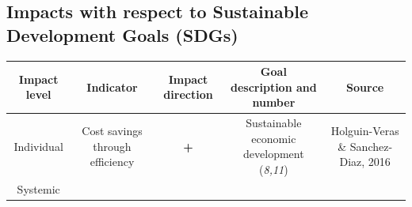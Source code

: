 \documentclass[
]{book}
\begin{document}
\hypertarget{impacts-with-respect-to-sustainable-development-goals-sdgs-30}{%
\subsection*{Impacts with respect to Sustainable Development Goals (SDGs)}\label{impacts-with-respect-to-sustainable-development-goals-sdgs-30}}

\begin{longtable}[]{@{}ccccc@{}}
\toprule
\begin{minipage}[b]{0.17\columnwidth}\centering
Impact level\strut
\end{minipage} & \begin{minipage}[b]{0.16\columnwidth}\centering
Indicator\strut
\end{minipage} & \begin{minipage}[b]{0.17\columnwidth}\centering
Impact direction\strut
\end{minipage} & \begin{minipage}[b]{0.17\columnwidth}\centering
Goal description and number\strut
\end{minipage} & \begin{minipage}[b]{0.17\columnwidth}\centering
Source\strut
\end{minipage}\tabularnewline
\midrule
\endhead
\begin{minipage}[t]{0.17\columnwidth}\centering
Individual\strut
\end{minipage} & \begin{minipage}[t]{0.16\columnwidth}\centering
Cost savings through efficiency\strut
\end{minipage} & \begin{minipage}[t]{0.17\columnwidth}\centering
\textbf{+}\strut
\end{minipage} & \begin{minipage}[t]{0.17\columnwidth}\centering
Sustainable economic development (\emph{8,11})\strut
\end{minipage} & \begin{minipage}[t]{0.17\columnwidth}\centering
Holguin-Veras \& Sanchez-Diaz, 2016\strut
\end{minipage}\tabularnewline
\begin{minipage}[t]{0.17\columnwidth}\centering
Systemic\strut
\end{minipage} & \begin{minipage}[t]{0.16\columnwidth}\centering

\end{minipage}
\end{longtable}
\end{document}
